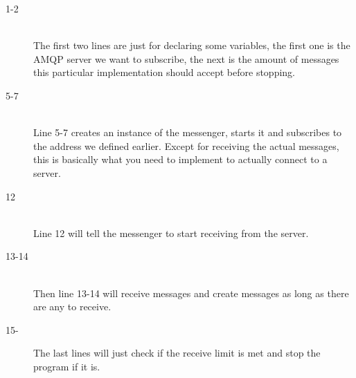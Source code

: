\begin{description}
\item[1-2] \hfill \\ The first two lines are just for declaring some variables, the first one is the AMQP server we want to subscribe, the next is the amount of messages this particular implementation should accept before stopping.

\item[5-7] \hfill \\ Line 5-7 creates an instance of the messenger, starts it and subscribes to the address we defined earlier. Except for receiving the actual messages, this is basically what you need to implement to actually connect to a server.

\item[12] \hfill \\ Line 12 will tell the messenger to start receiving from the server. 
\item[13-14] \hfill \\ Then line 13-14 will receive messages and create messages as long as there are any to receive.

\item[15-] \hfill The last lines will just check if the receive limit is met and stop the program if it is.
\end{description}

\clearpage